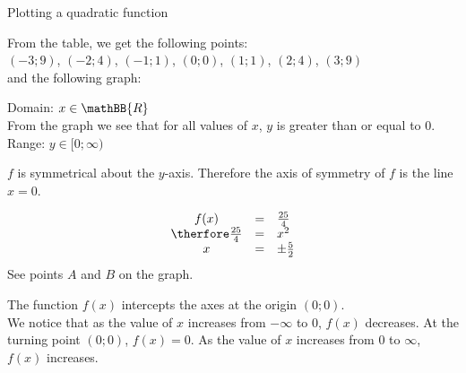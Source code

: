 \begin{wex}{Plotting a quadratic function}
{
From the table, we get the following points: \\
$(-3;9)$, $(-2;4)$, $(-1;1)$, $(0;0)$, $(1;1)$, $(2;4)$, $(3;9)$ \\
and the following graph: 

Domain: $x \in \mathBB{R}$\\
From the graph we see that for all values of $x$, $y$ is greater than or equal to $0$.\\
Range: $y \in [0; \infty)$

$f$ is symmetrical about the $y$-axis. Therefore the axis of symmetry of $f$ is the line $x=0$. 

\begin{equation*}
 \begin{array}{ccl}
f(x) &=& \frac{25}{4} \\
\therfore \frac{25}{4} &=& x^{2} \\
x &=& \pm \frac{5}{2} 
\end{array}
\end{equation*}
See points $A$ and $B$ on the graph.

The function $f(x)$ intercepts the axes at the origin $(0;0)$. \\
We notice that as the value of $x$ increases from $-\infty$ to $0$, $f(x)$ decreases. At the turning point $(0;0)$, $f(x) = 0$. As the value of $x$ increases from $0$ to $\infty$, $f(x)$ increases.
}
\end{wex}





